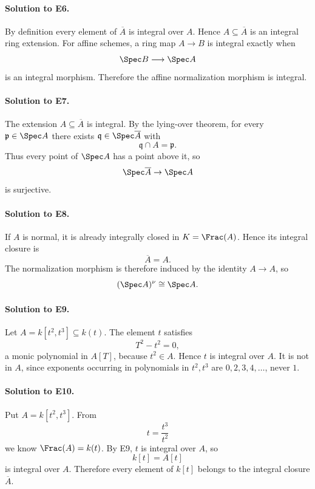 \paragraph{Solution to E6.}
By definition every element of \(\overline A\) is integral over \(A\).  Hence
\(A\subseteq\overline A\) is an integral ring extension.  For affine schemes, a ring map
\(A\to B\) is integral exactly when
\[
\Spec B\longrightarrow\Spec A
\]
is an integral morphism.  Therefore the affine normalization morphism is integral.

\paragraph{Solution to E7.}
The extension \(A\subseteq\overline A\) is integral.  By the lying-over theorem, for every
\(\mathfrak p\in\Spec A\) there exists
\(\mathfrak q\in\Spec\overline A\) with
\[
\mathfrak q\cap A=\mathfrak p.
\]
Thus every point of \(\Spec A\) has a point above it, so
\[
\Spec\overline A\to\Spec A
\]
is surjective.

\paragraph{Solution to E8.}
If \(A\) is normal, it is already integrally closed in \(K=\Frac(A)\).  Hence its integral closure
is
\[
\overline A=A.
\]
The normalization morphism is therefore induced by the identity \(A\to A\), so
\[
(\Spec A)^\nu\cong\Spec A.
\]

\paragraph{Solution to E9.}
Let \(A=k[t^2,t^3]\subseteq k(t)\).  The element \(t\) satisfies
\[
T^2-t^2=0,
\]
a monic polynomial in \(A[T]\), because \(t^2\in A\).  Hence \(t\) is integral over \(A\).
It is not in \(A\), since exponents occurring in polynomials in \(t^2,t^3\) are
\(0,2,3,4,\ldots\), never \(1\).

\paragraph{Solution to E10.}
Put \(A=k[t^2,t^3]\).  From
\[
t=\frac{t^3}{t^2}
\]
we know \(\Frac(A)=k(t)\).  By E9, \(t\) is integral over \(A\), so
\[
k[t]=A[t]
\]
is integral over \(A\).  Therefore every element of \(k[t]\) belongs to the integral closure
\(\overline A\).

